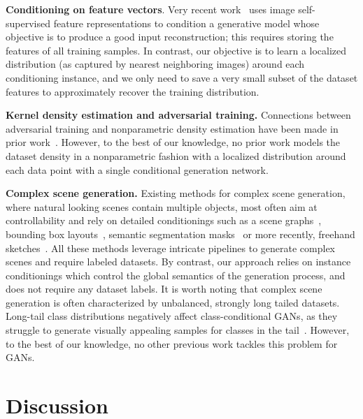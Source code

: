 \textbf{Conditioning on feature vectors}. Very recent work~\cite{mangla2021data} uses image self-supervised feature representations to condition a generative model whose objective is to produce a good input reconstruction; this requires storing the features of all training samples. In contrast, our objective is to learn a localized distribution (as captured by nearest neighboring images) around each conditioning instance, and we only need to save a very small subset of the dataset features to approximately recover the training distribution.

\textbf{Kernel density estimation and adversarial training.}  Connections between adversarial training and nonparametric density estimation   have been made in  prior work~\cite{ abbasnejad2019generative}. However, to the best of our knowledge, no prior work models  the dataset density  in a nonparametric fashion with a localized distribution around each data point with a single conditional  generation network.

\textbf{Complex scene generation.}  Existing methods for complex scene generation, where natural looking scenes contain multiple objects, most often aim at controllability and rely on detailed conditionings such as a scene graphs~\cite{ashual2019specifying,johnson2018image}, bounding box layouts~\cite{sun2019image,sun2020learning,sylvain2020object,Zhao_2019_CVPR}, semantic segmentation masks~\cite{chen2017photographic,  park2019SPADE,qi2018semi, tang2020local,wang2018high} or more recently, freehand sketches~\cite{gao2020sketchycoco}. All these methods leverage intricate pipelines to generate complex scenes and require labeled datasets. By contrast, our approach relies on instance conditionings which control the global semantics of the generation process, and does not require any dataset labels. It is worth noting that complex scene generation is often characterized by unbalanced, strongly long tailed datasets. Long-tail class distributions negatively affect class-conditional GANs, as they struggle to generate visually appealing samples for classes in the tail~\cite{casanova2020generating}. However, to the best of our knowledge, no other previous work tackles this problem for GANs. 

\section{Discussion}
\label{sec:discussion}

